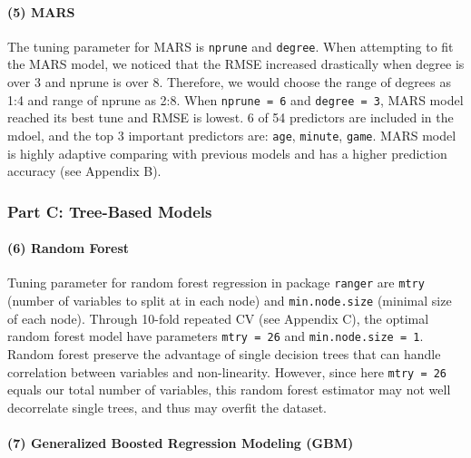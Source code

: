 \documentclass[
]{article}
\begin{document}
\hypertarget{mars}{%
\paragraph{(5) MARS}\label{mars}}

The tuning parameter for MARS is \texttt{nprune} and \texttt{degree}.
When attempting to fit the MARS model, we noticed that the RMSE
increased drastically when degree is over 3 and nprune is over 8.
Therefore, we would choose the range of degrees as 1:4 and range of
nprune as 2:8. When \texttt{nprune\ =\ 6} and \texttt{degree\ =\ 3},
MARS model reached its best tune and RMSE is lowest. 6 of 54 predictors
are included in the mdoel, and the top 3 important predictors are:
\texttt{age}, \texttt{minute}, \texttt{game}. MARS model is highly
adaptive comparing with previous models and has a higher prediction
accuracy (see Appendix B).

\hypertarget{part-c-tree-based-models}{%
\subsubsection{Part C: Tree-Based
Models}\label{part-c-tree-based-models}}

\hypertarget{random-forest}{%
\paragraph{(6) Random Forest}\label{random-forest}}

Tuning parameter for random forest regression in package \texttt{ranger}
are \texttt{mtry} (number of variables to split at in each node) and
\texttt{min.node.size} (minimal size of each node). Through 10-fold
repeated CV (see Appendix C), the optimal random forest model have
parameters \texttt{mtry\ =\ 26} and \texttt{min.node.size\ =\ 1}. Random
forest preserve the advantage of single decision trees that can handle
correlation between variables and non-linearity. However, since here
\texttt{mtry\ =\ 26} equals our total number of variables, this random
forest estimator may not well decorrelate single trees, and thus may
overfit the dataset.

\hypertarget{generalized-boosted-regression-modeling-gbm}{%
\paragraph{(7) Generalized Boosted Regression Modeling
(GBM)}\label{generalized-boosted-regression-modeling-gbm}}
\end{document}
